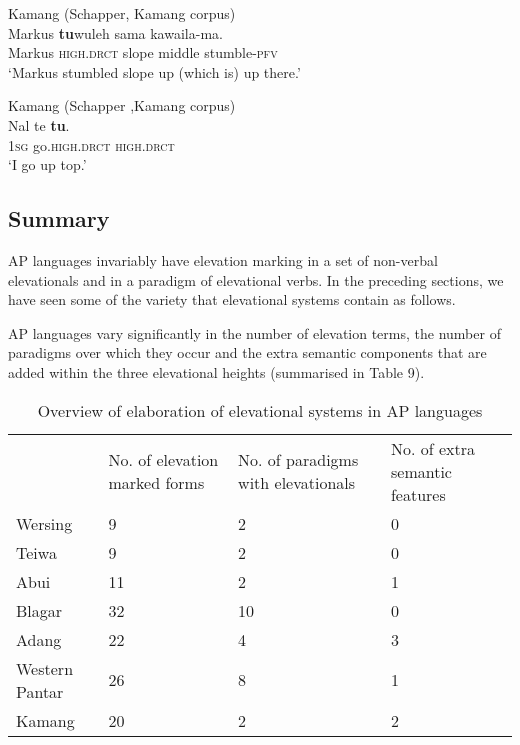 \ea%
\label{ex:39}
   Kamang (Schapper, Kamang corpus)   \\
\gll Markus  \textbf{{tu}}\textbf{{{\ng}}}{wuleh}  {sama  kawaila-ma.}\\
 Markus  \textsc{high.drct} slope  middle  stumble-\textsc{pfv}  \\
\glt `Markus stumbled slope up (which is) up there.'
\z









\ea%
\label{ex:40}
  Kamang (Schapper ,Kamang corpus)   \\
\gll Nal   te  \textbf{{tu}}\textbf{{{\ng}}}{.}\\
 \textsc{1sg} go.\textsc{high.drct} \textsc {high.drct}   \\
\glt  `I go up top.'
\z







\subsection{Summary}
AP languages invariably have elevation marking in a set of non-verbal elevationals and in a paradigm of elevational verbs. In the preceding sections, we have seen some of the variety that elevational systems contain as follows.

AP languages vary significantly in the number of elevation terms, the number of paradigms over which they occur and the extra semantic components that are added within the three elevational heights (summarised in Table 9).




\begin{table}


\begin{tabular}{llll}
 & No. of elevation marked forms & No. of paradigms with elevationals & No. of extra semantic features\\
Wersing & 9& 2& 0\\
Teiwa & 9& 2& 0\\
Abui & 11& 2& 1\\
Blagar & 32& 10& 0\\
Adang & 22& 4& 3\\
Western Pantar & 26& 8& 1\\
Kamang & 20& 2& 2\\
\end{tabular}

\caption{Overview of elaboration of elevational systems in AP languages}
\end{table}

